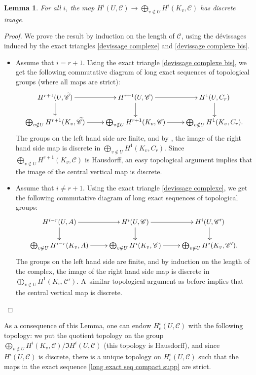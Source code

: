 \documentclass[11pt]{article}
\let\mathcal\mathscr
\newcommand{\rc}{\mathrm{c}}
\theoremstyle{plain}
\newtheorem{lem}[theo]{Lemma}
\theoremstyle{definition}
\newcommand \cC {\mathcal{C}}
\begin{document}
\begin{lem} \label{closedimagecomplex}
For all $i$, the map $H^i(U, \cC) \to \bigoplus_{v \notin U} H^{i}(K_v,\cC)$ has discrete image.
\end{lem}

\begin{proof}
We prove the result by induction on the length of $\cC$, using the dévissages induced by the exact triangles \eqref{devissage complexe} and \eqref{devissage complexe bis}.
\begin{itemize}
\item Assume that $i = r+1$. Using the exact triangle \eqref{devissage complexe bis}, we get the following commutative diagram of long exact sequences of topological groups (where all maps are strict):\vspace*{-5pt}
\[
\xymatrix@R=6mm{
H^{r+1}(U, \widetilde{\cC}) \ar[r] \ar[d] & H^{r+1}(U, \cC) \ar[r] \ar[d] & H^1(U, C_r) \ar[d] \\
\bigoplus_{v \notin U} H^{r+1}(K_v, \widetilde{\cC}) \ar[r] & \bigoplus_{v \notin U} H^{r+1}(K_v, \cC) \ar[r] & \bigoplus_{v \notin U} H^1(K_v, C_r).
}
\]
The groups on the left hand side are finite, and by \cite[Lem.\,2.7]{cesnalms}, the image of the right hand side map is discrete in $\bigoplus_{v \notin U} H^1(K_v, C_r)$. Since $\bigoplus_{v \notin U} H^{r+1}(K_v, \cC)$ is Hausdorff, an easy topological argument implies that the image of the central vertical map is discrete.
\item Assume that $i \neq r+1$. Using the exact triangle \eqref{devissage complexe}, we get the following commutative diagram of long exact sequences of topological groups:\vspace*{-3pt}
\[
\xymatrix@R=6mm{
H^{i-r}(U, A) \ar[r] \ar[d] & H^{i}(U, \cC) \ar[r] \ar[d] & H^i(U, \cC') \ar[d] \\
\bigoplus_{v \notin U} H^{i-r}(K_v, A) \ar[r] & \bigoplus_{v \notin U} H^{i}(K_v, \cC) \ar[r] & \bigoplus_{v \notin U} H^i(K_v, \cC').
}
\]
The groups on the left hand side are finite, and by induction on the length of the complex, the image of the right hand side map is discrete in $\bigoplus_{v \notin U} H^1(K_v, \cC')$. A~similar topological argument as before implies that the central vertical map is discrete.\qedhere
\end{itemize}
\end{proof}

As a consequence of this Lemma, one can endow $H^i_\rc(U, \cC)$ with the following topology: we put the quotient topology on the group $\bigoplus_{v \notin U} H^{i}(K_v,\cC) / \Im H^i(U, \cC)$ (this topology is Hausdorff),
and since $H^i(U, \cC)$ is discrete, there is a unique topology on $H^i_\rc(U, \cC)$ such that the maps in the exact sequence \eqref{long exact seq compact supp} are strict.
\end{document}
